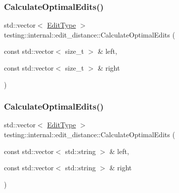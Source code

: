 \subsubsection{\texorpdfstring{CalculateOptimalEdits()}{CalculateOptimalEdits()}\hspace{0.1cm}{\footnotesize\ttfamily [1/2]}}
{\footnotesize\ttfamily std\+::vector$<$ \mbox{\hyperlink{namespacetesting_1_1internal_1_1edit__distance_ad46aa6da12aec1a3f166310478b53a08}{Edit\+Type}} $>$ testing\+::internal\+::edit\+\_\+distance\+::\+Calculate\+Optimal\+Edits (\begin{DoxyParamCaption}\item[{const std\+::vector$<$ size\+\_\+t $>$ \&}]{left,  }\item[{const std\+::vector$<$ size\+\_\+t $>$ \&}]{right }\end{DoxyParamCaption})}

\mbox{\label{namespacetesting_1_1internal_1_1edit__distance_a32267b2ae24de1de175ac8217406877d}} 
\subsubsection{\texorpdfstring{CalculateOptimalEdits()}{CalculateOptimalEdits()}\hspace{0.1cm}{\footnotesize\ttfamily [2/2]}}
{\footnotesize\ttfamily std\+::vector$<$ \mbox{\hyperlink{namespacetesting_1_1internal_1_1edit__distance_ad46aa6da12aec1a3f166310478b53a08}{Edit\+Type}} $>$ testing\+::internal\+::edit\+\_\+distance\+::\+Calculate\+Optimal\+Edits (\begin{DoxyParamCaption}\item[{const std\+::vector$<$ std\+::string $>$ \&}]{left,  }\item[{const std\+::vector$<$ std\+::string $>$ \&}]{right }\end{DoxyParamCaption})}

\mbox{\label{namespacetesting_1_1internal_1_1edit__distance_ac4c24a581ff433d7aca7ed12c9133fb1}} 
